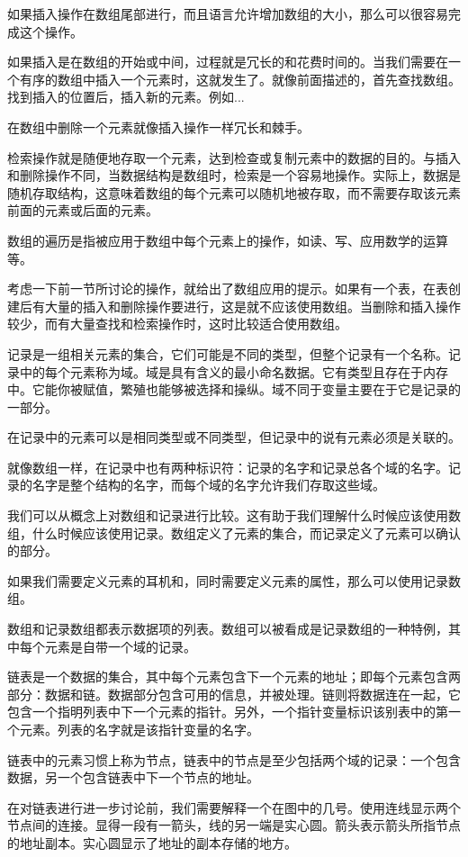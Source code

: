 如果插入操作在数组尾部进行，而且语言允许增加数组的大小，那么可以很容易完成这个操作。

如果插入是在数组的开始或中间，过程就是冗长的和花费时间的。当我们需要在一个有序的数组中插入一个元素时，这就发生了。就像前面描述的，首先查找数组。找到插入的位置后，插入新的元素。例如...

在数组中删除一个元素就像插入操作一样冗长和棘手。

检索操作就是随便地存取一个元素，达到检查或复制元素中的数据的目的。与插入和删除操作不同，当数据结构是数组时，检索是一个容易地操作。实际上，数据是随机存取结构，这意味着数组的每个元素可以随机地被存取，而不需要存取该元素前面的元素或后面的元素。

数组的遍历是指被应用于数组中每个元素上的操作，如读、写、应用数学的运算等。

考虑一下前一节所讨论的操作，就给出了数组应用的提示。如果有一个表，在表创建后有大量的插入和删除操作要进行，这是就不应该使用数组。当删除和插入操作较少，而有大量查找和检索操作时，这时比较适合使用数组。

记录是一组相关元素的集合，它们可能是不同的类型，但整个记录有一个名称。记录中的每个元素称为域。域是具有含义的最小命名数据。它有类型且存在于内存中。它能你被赋值，繁殖也能够被选择和操纵。域不同于变量主要在于它是记录的一部分。

在记录中的元素可以是相同类型或不同类型，但记录中的说有元素必须是关联的。

就像数组一样，在记录中也有两种标识符：记录的名字和记录总各个域的名字。记录的名字是整个结构的名字，而每个域的名字允许我们存取这些域。

我们可以从概念上对数组和记录进行比较。这有助于我们理解什么时候应该使用数组，什么时候应该使用记录。数组定义了元素的集合，而记录定义了元素可以确认的部分。

如果我们需要定义元素的耳机和，同时需要定义元素的属性，那么可以使用记录数组。

数组和记录数组都表示数据项的列表。数组可以被看成是记录数组的一种特例，其中每个元素是自带一个域的记录。

链表是一个数据的集合，其中每个元素包含下一个元素的地址；即每个元素包含两部分：数据和链。数据部分包含可用的信息，并被处理。链则将数据连在一起，它包含一个指明列表中下一个元素的指针。另外，一个指针变量标识该别表中的第一个元素。列表的名字就是该指针变量的名字。

链表中的元素习惯上称为节点，链表中的节点是至少包括两个域的记录：一个包含数据，另一个包含链表中下一个节点的地址。

在对链表进行进一步讨论前，我们需要解释一个在图中的几号。使用连线显示两个节点间的连接。显得一段有一箭头，线的另一端是实心圆。箭头表示箭头所指节点的地址副本。实心圆显示了地址的副本存储的地方。

